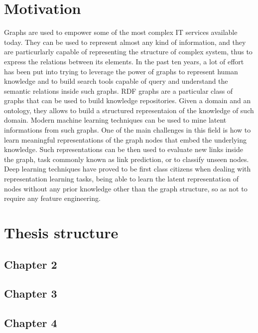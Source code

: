 \documentclass[%
    corpo=13.5pt,
    twoside,
    oldstyle,
    tipotesi=magistrale,
    greek,
    evenboxes
]{toptesi}
\begin{document}
\section{Motivation}

Graphs are used to empower some of the most complex IT services available
today. They can be used to represent almost any kind of information, and
they are particurlarly capable of representing the structure of complex
system, thus to express the relations between its elements.
\newline
\newline
In the past ten years, a lot of effort has been put into trying to leverage the power
of graphs to represent human knowledge and to build search tools capable of
query and understand the semantic relations inside such graphs. RDF graphs are a
particular class of graphs that can be used to build knowledge
repositories. Given a domain and an ontology, they allows to build a structured
representaion of the knowledge of such domain.
\newline
\newline
Modern machine learning techniques can be used to mine latent informations
from such graphs. One of the main challenges in this field is how to learn
meaningful representations of the graph nodes that embed the underlying
knowledge. Such representations can be then used to evaluate new
links inside the graph, task commonly known as link prediction, or to classify
unseen nodes. Deep learning techniques have proved to be first class citizens when
dealing with representation learning tasks, being able to learn the latent
representation of nodes without any prior knowledge other than the graph structure,
so as not to require any feature engineering.



\section{Thesis structure}

\subsection{Chapter 2}

\subsection{Chapter 3}

\subsection{Chapter 4}
\end{document}

